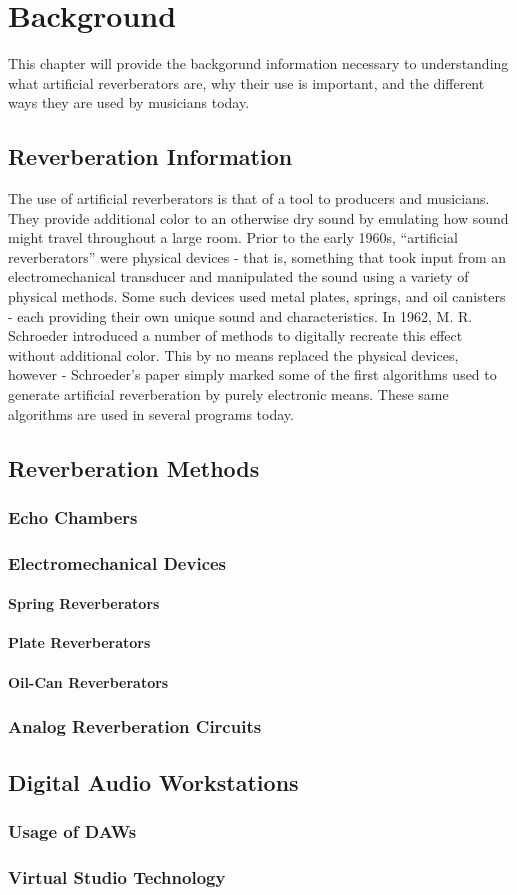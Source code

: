\chapter{Background}
\hspace*{-0.155cm}This chapter will provide the backgorund information necessary to understanding what artificial reverberators are, why their use is important, and the different ways they are used by musicians today.

\section{Reverberation Information}
The use of artificial reverberators is that of a tool to producers and musicians. They provide additional color to an otherwise dry sound by emulating how sound might travel throughout a large room. Prior to the early 1960s, ``artificial reverberators'' were physical devices - that is, something that took input from an electromechanical transducer and manipulated the sound using a variety of physical methods. Some such devices used metal plates, springs, and oil canisters - each providing their own unique sound and characteristics. In 1962, M. R. Schroeder introduced a number of methods to digitally recreate this effect without additional color. This by no means replaced the physical devices, however - Schroeder's paper simply marked some of the first algorithms used to generate artificial reverberation by purely electronic means. These same algorithms are used in several programs today.

\section{Reverberation Methods}

\subsection{Echo Chambers}

\subsection{Electromechanical Devices}
\subsubsection{Spring Reverberators}
\subsubsection{Plate Reverberators}
\subsubsection{Oil-Can Reverberators}
\subsection{Analog Reverberation Circuits}
\section{Digital Audio Workstations}
\subsection{Usage of DAWs}
\subsection{Virtual Studio Technology}
